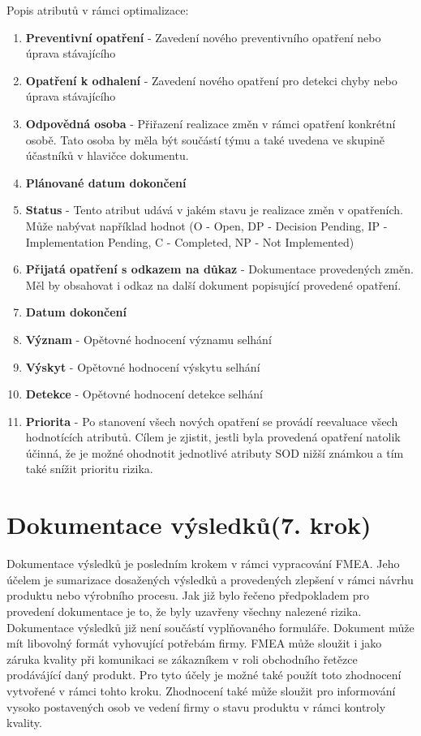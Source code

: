 Popis atributů v rámci optimalizace:
\begin{enumerate}
	\item \textbf{Preventivní opatření} - Zavedení nového preventivního opatření nebo úprava stávajícího
	\item \textbf{Opatření k odhalení} - Zavedení nového opatření pro detekci chyby nebo úprava stávajícího
	\item \textbf{Odpovědná osoba} - Přiřazení realizace změn v rámci opatření konkrétní osobě. Tato osoba by měla být součástí týmu a také uvedena ve skupině účastníků v hlavičce dokumentu.
	\item \textbf{Plánované datum dokončení}
	\item \textbf{Status} - Tento atribut udává v jakém stavu je realizace změn v opatřeních. Může nabývat například hodnot (O - Open, DP - Decision Pending, IP - Implementation Pending, C - Completed, NP - Not Implemented)
	\item \textbf{Přijatá opatření s odkazem na důkaz} - Dokumentace provedených změn. Měl by obsahovat i odkaz na další dokument popisující provedené opatření. 
	\item \textbf{Datum dokončení} 
	\item \textbf{Význam} - Opětovné hodnocení významu selhání
	\item \textbf{Výskyt} - Opětovné hodnocení výskytu selhání
	\item \textbf{Detekce} - Opětovné hodnocení detekce selhání
	\item \textbf{Priorita} - Po stanovení všech nových opatření se provádí reevaluace všech hodnotících atributů. Cílem je zjistit, jestli byla provedená opatření natolik účinná, že je možné ohodnotit jednotlivé atributy SOD nižší známkou a tím také snížit prioritu rizika. 
\end{enumerate}

\section{Dokumentace výsledků(7. krok)}
Dokumentace výsledků je posledním krokem v rámci vypracování FMEA. Jeho účelem je sumarizace dosažených výsledků a provedených zlepšení v rámci návrhu produktu nebo výrobního procesu. Jak již bylo řečeno předpokladem pro provedení dokumentace je to, že byly uzavřeny všechny nalezené rizika. Dokumentace výsledků již není součástí vyplňovaného formuláře. Dokument může mít libovolný formát vyhovující potřebám firmy. FMEA může sloužit i jako záruka kvality při komunikaci se zákazníkem v roli obchodního řetězce prodávájící daný produkt. Pro tyto účely je možné také použít toto zhodnocení vytvořené v rámci tohto kroku. Zhodnocení také může sloužit pro informování vysoko postavených osob ve vedení firmy o stavu produktu v rámci kontroly kvality. 
  